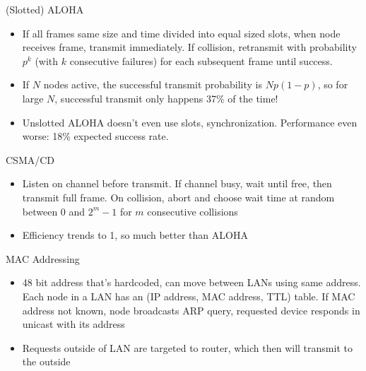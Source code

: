 \documentclass{beamer}
\begin{document}
\begin{frame}[t]{(Slotted) ALOHA}
    \begin{itemize}
        \item If all frames same size and time divided into equal sized slots, when node receives frame, transmit immediately. If collision, retransmit with probability $p^k$ (with $k$ consecutive failures) for each subsequent frame until success.
        \pause\item If $N$ nodes active, the successful transmit probability is $Np(1-p)$, so for large $N$, successful transmit only happens 37\% of the time!
        \pause\item Unslotted ALOHA doesn't even use slots, synchronization. Performance even worse: 18\% expected success rate.
    \end{itemize}
    
\end{frame}



\begin{frame}[t]{CSMA/CD}
    \begin{itemize}
        \item Listen on channel before transmit. If channel busy, wait until free, then transmit full frame. On collision, abort and choose wait time at random between 0 and $2^m - 1$ for $m$ consecutive collisions
        \item Efficiency trends to 1, so much better than ALOHA
    \end{itemize}
\end{frame}

\begin{frame}[t]{MAC Addressing}
    \begin{itemize}
        \item 48 bit address that's hardcoded, can move between LANs using same address. Each node in a LAN has an (IP address, MAC address, TTL) table. If MAC address not known, node broadcasts ARP query, requested device responds in unicast with its address
        \item Requests outside of LAN are targeted to router, which then will transmit to the outside
    \end{itemize}
\end{frame}
\end{document}
